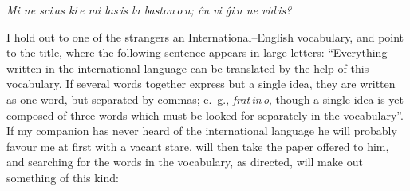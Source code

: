     \emph{Mi ne sci\,as ki\,e mi las\,is la baston\,o\,n; ĉu vi ĝi\,n ne vid\,is?}

I hold out to one of the strangers an International--English vocabulary, and point to the title, where the following sentence appears in large letters: “Everything written in the international language can be translated by the help of this vocabulary. If several words together express but a single idea, they are written as one word, but separated by commas; e.~g., \emph{frat\,in\,o}, though a single idea is yet composed of three words which must be looked for separately in the vocabulary”. If my companion has never heard of the international language he will probably favour me at first with a vacant stare, will then take the paper offered to him, and searching for the words in the vocabulary, as directed, will make out something of this kind:

